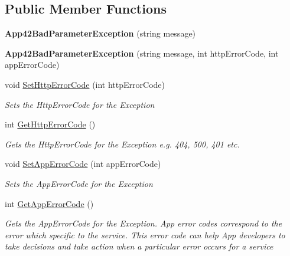 \subsection*{Public Member Functions}
\begin{DoxyCompactItemize}
\item 
\hypertarget{classcom_1_1shephertz_1_1app42_1_1paas_1_1sdk_1_1csharp_1_1_app42_bad_parameter_exception_a07294216051287a854206cada0928ac3}{{\bfseries App42\+Bad\+Parameter\+Exception} (string message)}\label{classcom_1_1shephertz_1_1app42_1_1paas_1_1sdk_1_1csharp_1_1_app42_bad_parameter_exception_a07294216051287a854206cada0928ac3}

\item 
\hypertarget{classcom_1_1shephertz_1_1app42_1_1paas_1_1sdk_1_1csharp_1_1_app42_bad_parameter_exception_a3080af64658dccbbc19817e83b1c2b23}{{\bfseries App42\+Bad\+Parameter\+Exception} (string message, int http\+Error\+Code, int app\+Error\+Code)}\label{classcom_1_1shephertz_1_1app42_1_1paas_1_1sdk_1_1csharp_1_1_app42_bad_parameter_exception_a3080af64658dccbbc19817e83b1c2b23}

\item 
void \hyperlink{classcom_1_1shephertz_1_1app42_1_1paas_1_1sdk_1_1csharp_1_1_app42_bad_parameter_exception_ad1256eea95d2ede73c409a481e7e0e57}{Set\+Http\+Error\+Code} (int http\+Error\+Code)
\begin{DoxyCompactList}\small\item\em Sets the Http\+Error\+Code for the Exception \end{DoxyCompactList}\item 
int \hyperlink{classcom_1_1shephertz_1_1app42_1_1paas_1_1sdk_1_1csharp_1_1_app42_bad_parameter_exception_adc6ec256df6cc3ae068b444988c67c8d}{Get\+Http\+Error\+Code} ()
\begin{DoxyCompactList}\small\item\em Gets the Http\+Error\+Code for the Exception e.\+g. 404, 500, 401 etc. \end{DoxyCompactList}\item 
void \hyperlink{classcom_1_1shephertz_1_1app42_1_1paas_1_1sdk_1_1csharp_1_1_app42_bad_parameter_exception_a09603f33a4aa4cfed75fc2cd179d19c5}{Set\+App\+Error\+Code} (int app\+Error\+Code)
\begin{DoxyCompactList}\small\item\em Sets the App\+Error\+Code for the Exception \end{DoxyCompactList}\item 
int \hyperlink{classcom_1_1shephertz_1_1app42_1_1paas_1_1sdk_1_1csharp_1_1_app42_bad_parameter_exception_adba812a4b94f49a5e1087d8ed3119f61}{Get\+App\+Error\+Code} ()
\begin{DoxyCompactList}\small\item\em Gets the App\+Error\+Code for the Exception. App error codes correspond to the error which specific to the service. This error code can help App developers to take decisions and take action when a particular error occurs for a service \end{DoxyCompactList}\end{DoxyCompactItemize}


